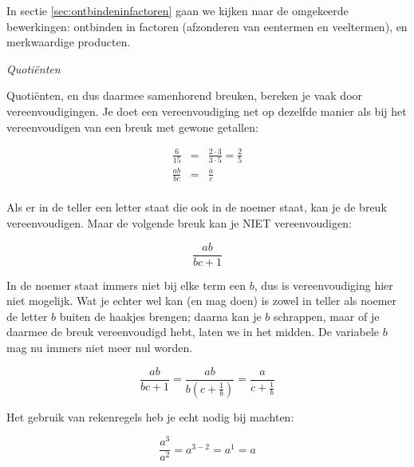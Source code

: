 	In sectie \ref{sec:ontbindeninfactoren} gaan we kijken naar de omgekeerde
	bewerkingen: ontbinden in factoren (afzonderen van eentermen en veeltermen),
	en merkwaardige producten.
	
	
	\emph{Quoti\"enten}
	
	Quoti\"enten, en dus daarmee samenhorend breuken, bereken je vaak door
	vereenvoudigingen. Je doet een vereenvoudiging net op dezelfde manier
	als bij het vereenvoudigen van een breuk met gewone getallen:
	
	\begin{eqnarray*}
		\frac{6}{15} & = & \frac{2 \cdot 3}{3\cdot 5} = \frac{2}{5}\\
		\frac{ab}{bc} & = & \frac{a}{c} \\
	\end{eqnarray*}
	

	Als er in de teller een letter staat die ook in de noemer
	staat, kan je de breuk vereenvoudigen. Maar de volgende breuk kan
	je NIET vereenvoudigen:
	
	\begin{equation*}
	\frac{ab}{bc+1}
	\end{equation*}
	
	In de noemer staat immers niet bij elke term een $b$, dus
	is vereenvoudiging hier niet mogelijk. Wat je echter wel kan (en mag
	doen) is zowel in teller als noemer de letter $b$ buiten de haakjes
	brengen; daarna kan je $b$ schrappen, maar of je daarmee de breuk
	vereenvoudigd hebt, laten we in het midden. De variabele $b$ mag
	nu immers niet meer nul worden.
	
	\begin{equation*}
	\frac{ab}{bc+1}={\displaystyle \frac{ab}{b(c+\frac{1}{b})}=\frac{a}{c+\frac{1}{b}}}
	\end{equation*}
	
	Het gebruik van rekenregels heb je echt nodig bij machten:
	
	\begin{equation*}
	\frac{a^{3}}{a^{2}}=a^{3-2}=a^{1}=a
	\end{equation*}
	
